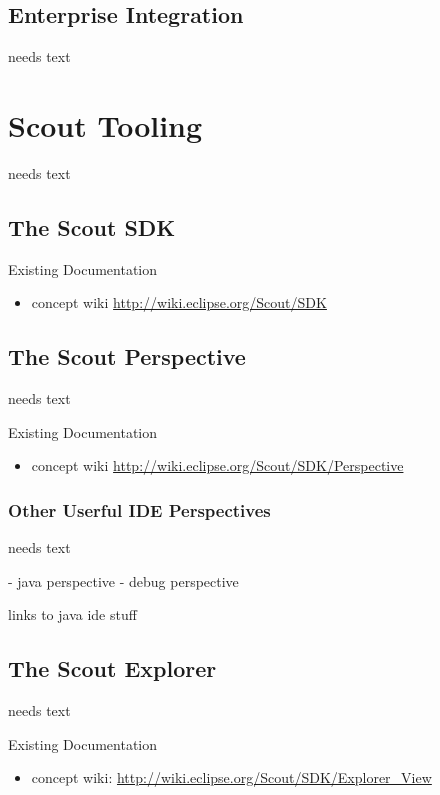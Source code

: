 \documentclass[a4paper,10pt,twoside]{book}
\begin{document}
\section{Enterprise Integration}
needs text

\chapter{Scout Tooling}
needs text

\section{The Scout SDK}

\noindent Existing Documentation
\begin{itemize}
  \item concept wiki \url{http://wiki.eclipse.org/Scout/SDK}
\end{itemize}

\section{The Scout Perspective}
needs text

\noindent Existing Documentation
\begin{itemize}
  \item concept wiki \url{http://wiki.eclipse.org/Scout/SDK/Perspective}
\end{itemize}

\subsection{Other Userful IDE Perspectives}
needs text

- java perspective
- debug perspective

links to java ide stuff

\section{The Scout Explorer}
needs text

\noindent Existing Documentation
\begin{itemize}
  \item concept wiki: \url{http://wiki.eclipse.org/Scout/SDK/Explorer_View}
\end{itemize}
\end{document}
